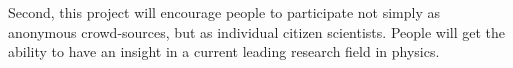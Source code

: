 \documentclass[11pt]{article}
\begin{document}

Second, this project will encourage people to participate not simply as anonymous crowd-sources, but as individual citizen scientists.
People will get the ability to have an insight in a current leading research field in physics.


\newpage


\end{document}
